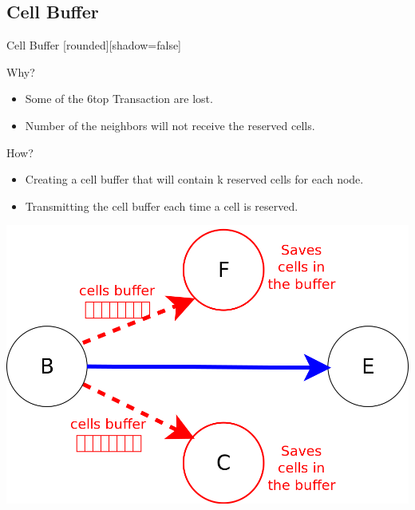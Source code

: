 \subsection{Cell Buffer}
\addtocounter{framenumber}{-1}
\begin{withoutheadline}
\begin{frame}{Cell Buffer}
[rounded][shadow=false]

\begin{block}{Why?}
\begin{itemize}

\item Some of the 6top Transaction are lost. 
\item Number of the neighbors will not receive the reserved cells. 

\end{itemize}
\end{block}

\begin{block}{How?}
\begin{itemize}


\item Creating a cell buffer that will contain k reserved cells for each node. 
\item<2-> Transmitting the cell buffer each time a cell is reserved.
\end{itemize}
\end{block}
\centering
\includegraphics[width=.4\linewidth]{figures/buff.png}

\end{frame}
\end{withoutheadline}